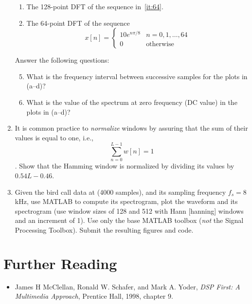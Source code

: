 \begin{enumerate}
\begin{enumerate}
\item The 128-point DFT of the sequence in~\ref{it:64}.

\item The 64-point DFT of the sequence 
\begin{equation*}
x[n]=\left\{\begin{array}{ll}
                        10e^{n\pi/8}  & n=0,1,\ldots,64 \\
                        0             & \text{otherwise}
           \end{array}\right.
\end{equation*}
\end{enumerate}

Answer the following questions:
\begin{enumerate}\setcounter{enumii}{4}
\item What is the frequency interval between successive samples for the
plots in (a--d)?

\item What is the value of the spectrum at zero frequency (DC value)
in the plots in (a--d)?
\end{enumerate}

\item It is common practice to \emph{normalize} windows by assuring
that the sum of their values is equal to one, i.e.,
\[ \sum_{n=0}^{L-1} w[n] = 1 \]. Show that the Hamming window is
normalized by dividing its values by $0.54L-0.46$.
\item Given the bird call data at
(4000 samples), and its sampling frequency $f_s=8$kHz, use MATLAB to
compute its spectrogram, plot the waveform and its spectrogram (use
window sizes of 128 and 512 with Hann [hanning] windows and an
increment of 1). Use only the base MATLAB toolbox (\emph{not} the
Signal Processing Toolbox). Submit the resulting figures and code.
\end{enumerate}

\section{Further Reading}

\begin{itemize}
\item James H McClellan, Ronald W. Schafer, and Mark A. Yoder,
  \textit{DSP First: A Multimedia Approach}, Prentice Hall, 1998,
  chapter 9.
\end{itemize}


